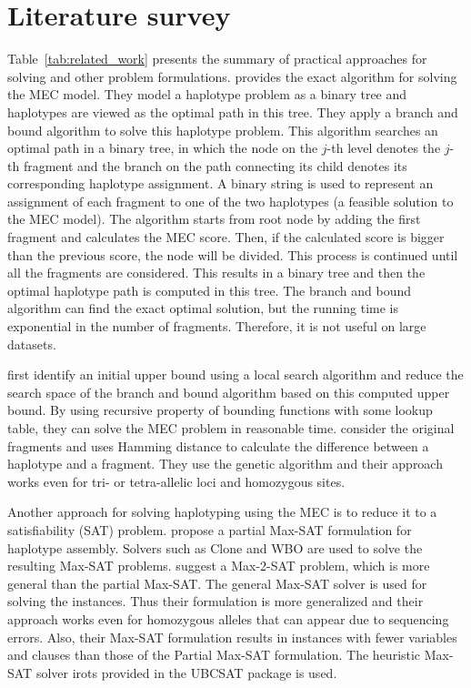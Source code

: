\section{Literature survey}
Table~\ref{tab:related_work} presents the summary of practical approaches for solving \MEC and other problem formulations.
\cite{wang2005haplotype} provides the exact algorithm for solving the MEC model. They model a haplotype problem as a binary tree and haplotypes are viewed as the optimal path in this tree. 
They apply a branch
and bound algorithm to solve this haplotype problem. 
This algorithm searches an optimal path in a binary tree, in which
the node on the $j$-th level denotes the $j$-th fragment and the
branch on the path connecting its child denotes its
corresponding haplotype assignment. 
A binary string is used to represent an assignment of each fragment to one of the two haplotypes (a feasible solution to the MEC model).
The algorithm starts from root node by adding the first fragment and calculates the MEC score. 
Then, if the calculated score is bigger than the previous score, the node will be divided. This process is continued until all the fragments are considered.
This results in a binary tree and then the optimal haplotype path is computed in this tree.
The branch and bound algorithm
can find the exact optimal solution, but the running time is exponential in the number of
fragments. Therefore, it is not useful on large datasets. 

\cite{lim2012individual} first identify an initial upper bound using a local search algorithm and 
reduce the search space of the branch and bound algorithm based on this computed upper bound.
By using recursive property of bounding functions with some lookup table, they can solve the MEC problem in reasonable time.
\cite{wang2012using} consider the original fragments and uses Hamming distance to calculate the difference between a haplotype and a fragment. 
They use the genetic algorithm and their approach works even for tri- or tetra-allelic loci and homozygous sites. 

Another approach for solving haplotyping using the MEC is to reduce it to a satisfiability (SAT) problem. 
\cite{he2010optimal} propose a partial Max-SAT formulation for haplotype assembly.
Solvers such as Clone and WBO are used to solve the resulting Max-SAT problems.
\cite{mousavi2011effective} suggest a Max-2-SAT problem,
which is more general than the partial Max-SAT. The general Max-SAT solver is used for solving the instances. Thus their formulation is more generalized and their approach works even for homozygous alleles that can appear due to sequencing errors.
Also, their Max-SAT formulation results in instances with fewer variables and clauses than those of the Partial Max-SAT formulation.
The heuristic Max-SAT solver irots provided in the UBCSAT package is used.

